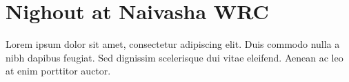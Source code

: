 \chapter{Nighout at Naivasha WRC}

Lorem ipsum dolor sit amet, consectetur adipiscing elit. Duis commodo nulla a nibh dapibus feugiat. Sed dignissim scelerisque dui vitae eleifend. Aenean ac leo at enim porttitor auctor.
